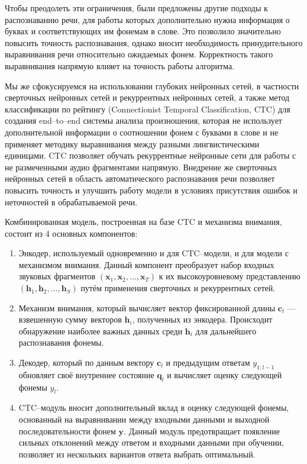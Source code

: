 Чтобы преодолеть эти ограничения, были предложены другие подходы\cite{li2016mispronunciation} к распознаванию речи, для работы которых дополнительно нужна информация о буквах и соответствующих им фонемам в слове. Это позволило значительно повысить точность распознавания, однако вносит необходимость принудительного выравнивания речи относительно ожидаемых фонем. Корректность такого выравнивания напрямую влияет на точность работы алгоритма.

Мы же сфокусируемся на использовании глубоких нейронных сетей, в частности сверточных нейронных сетей и рекуррентных нейронных сетей, а также метод классификации по рейтингу (Connectionist Temporal Classification, CTC)\cite{graves2006connectionist} для создания end--to--end системы анализа произношения, которая не использует дополнительной информации о соотношении фонем с буквами в слове и не применяет методику выравнивания между разными лингвистическими единицами. CTC позволяет обучать рекуррентные нейронные сети для работы с не размеченными аудио фрагментами напрямую\cite{graves2014towards, audhkhasi2017direct}. Внедрение же сверточных нейронных сетей в область автоматического распознавания речи позволяет повысить точность\cite{abdel2012applying} и улучшить работу модели в условиях присутствия ошибок и неточностей в обрабатываемой речи\cite{palaz2015analysis}.

Комбинированная модель, построенная на базе CTC и механизма внимания, состоит из 4 основных компонентов:
\begin{enumerate}
	\item Энкодер, используемый одновременно и для CTC--модели, и для модели с механизмом внимания. Данный компонент преобразует набор входных звуковых фрагментов $(\mathbf{x}_1, \mathbf{x}_2, \dots, \mathbf{x}_T)$ к их высокоуровневому представлению $(\mathbf{h}_1, \mathbf{h}_2, \dots, \mathbf{h}_S)$ путём применения сверточных и рекуррентных сетей.
	\item Механизм внимания, который вычисляет вектор фиксированной длины $\mathbf{c}_l$ --- взвешенную сумму векторов $\mathbf{h}_i$, полученных из энкодера. Происходит обнаружение наиболее важных данных среди $\mathbf{h}_i$ для дальнейшего распознавания фонемы.
	\item Декодер, который по данным вектору $\mathbf{c}_l$ и предыдущим ответам $y_{1:l-1}$ обновляет своё внутреннее состояние $\mathbf{q}_l$ и вычисляет оценку следующей фонемы $y_l$.
	\item CTC--модуль вносит дополнительный вклад в оценку следующей фонемы, основанный на выравнивании между входными данными и выходной последовательности фонем $\mathbf{y}$. Данный модуль предотвращает появление сильных отклонений между ответом и входными данными при обучении, позволяет из нескольких вариантов ответа выбрать оптимальный.
\end{enumerate}

